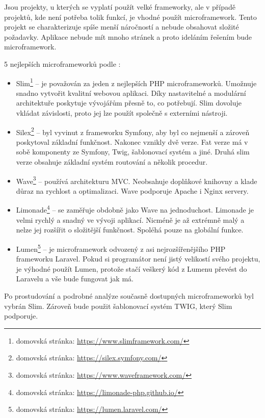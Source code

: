             Jsou projekty, u kterých se vyplatí použít velké frameworky, ale v případě projektů, kde není potřeba tolik funkcí, je vhodné použít microframework. Tento projekt se charakterizuje spíše menší náročností a nebude obsahovat složité požadavky. Aplikace nebude mít mnoho stránek a proto ideláním řešením bude microframework.
            
            5 nejlepších microframeworků podle \cite{microframeworks}:
            
            \begin{itemize}
                \item Slim\footnote{domovská stránka: \url{https://www.slimframework.com/}} – je považován za jeden z nejlepších PHP microframeworků. Umožnuje snadno vytvořit kvalitní webovou aplikaci. Díky nastavitelné a modulární architektuře poskytuje vývojářům přesně to, co potřebují. Slim dovoluje vkládat závislosti, proto jej lze použít společně s externími nástroji.
                
                \item Silex\footnote{domovská stránka: \url{https://silex.symfony.com/}} – byl vyvinut z frameworku Symfony, aby byl co nejmenší a zároveň poskytoval základní funkčnost. Nakonec vznikly dvě verze. Fat verze má v sobě komponenty ze Symfony, Twig, šablonovací systém a jiné. Druhá slim verze obsahuje základní systém routování a několik procedur. 
                
                \item Wave\footnote{domovská stránka: \url{https://www.waveframework.com/}} – používá architekturu MVC. Neobsahuje doplňkové knihovny a klade důraz na rychlost a optimalizaci. Wave podporuje Apache i Nginx servery.
                
                \item Limonade\footnote{domovská stránka: \url{https://limonade-php.github.io/}} – se zaměřuje obdobně jako Wave na jednoduchost. Limonade je velmi rychlý a snadný ve vývoji aplikací. Nicméně je až extrémně malý a nelze jej rozšířit o složitější funkčnost. Spoléhá pouze na globální funkce.
                
                \item Lumen\footnote{domovská stránka: \url{https://lumen.laravel.com/}} – je microframework odvozený z asi nejrozšířenějšího PHP frameworku Laravel. Pokud si programátor není jistý velikostí svého projektu, je výhodné použít Lumen, protože stačí veškerý kód z Lumenu převést do Laravelu a vše bude fungovat jak má.
            \end{itemize}
        
        Po prostudování a podrobné analýze současně dostupných microframeworků byl vybrán Slim. Zároveň bude použit šablonovací systém TWIG, který Slim podporuje.
        
